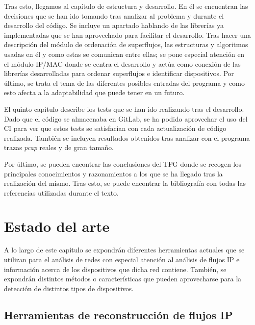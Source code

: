 \documentclass[twoside, 12pt]{epstfg}
\begin{document}
Tras esto, llegamos al capítulo de estructura y desarrollo. En él se encuentran las decisiones que se han ido tomando tras analizar al problema y durante el desarrollo del código. Se incluye un apartado hablando de las librerías ya implementadas que se han aprovechado para facilitar el desarrollo. Tras hacer una descripción del módulo de ordenación de superflujos, las estructuras y algoritmos usadas en él y como estas se comunican entre ellas; se pone especial atención en el módulo IP/MAC donde se centra el desarrollo y actúa como conexión de las librerías desarrolladas para ordenar superflujos e identificar dispositivos. Por último, se trata el tema de las diferentes posibles entradas del programa y como esto afecta a la adaptabilidad que puede tener en un futuro.

El quinto capítulo describe los tests que se han ido realizando tras el desarrollo. Dado que el código se almacenaba en GitLab, se ha podido aprovechar el uso del CI para ver que estos tests se satisfacían con cada actualización de código realizada. También se incluyen resultados obtenidos tras analizar con el programa trazas \textit{pcap} reales y de gran tamaño.

Por último, se pueden encontrar las conclusiones del TFG donde se recogen los principales conocimientos y razonamientos a los que se ha llegado tras la realización del mismo. Tras esto, se puede encontrar la bibliografía con todas las referencias utilizadas durante el texto.


\chapter{Estado del arte}
A lo largo de este capítulo se expondrán diferentes herramientas actuales que se utilizan para el análisis de redes con especial atención al análisis de flujos IP e información acerca de los dispositivos que dicha red contiene. También, se expondrán distintos métodos o características que pueden aprovecharse para la detección de distintos tipos de dispositivos.

\section{Herramientas de reconstrucción de flujos IP}
\end{document}
